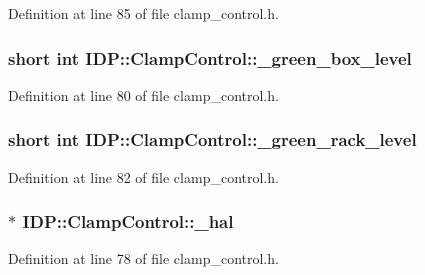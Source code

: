 Definition at line 85 of file clamp\_\-control.h.

\hypertarget{classIDP_1_1ClampControl_a4525ba276d66d2d29a8f1feb956bb769}{
\subsubsection[{\_\-green\_\-box\_\-level}]{\setlength{\rightskip}{0pt plus 5cm}short int {\bf IDP::ClampControl::\_\-green\_\-box\_\-level}}}
\label{classIDP_1_1ClampControl_a4525ba276d66d2d29a8f1feb956bb769}


Definition at line 80 of file clamp\_\-control.h.

\hypertarget{classIDP_1_1ClampControl_af6424de6982b37b9aab8d190b06d51be}{
\subsubsection[{\_\-green\_\-rack\_\-level}]{\setlength{\rightskip}{0pt plus 5cm}short int {\bf IDP::ClampControl::\_\-green\_\-rack\_\-level}}}
\label{classIDP_1_1ClampControl_af6424de6982b37b9aab8d190b06d51be}


Definition at line 82 of file clamp\_\-control.h.

\hypertarget{classIDP_1_1ClampControl_ac0c31fdbef30bc0c0d729843c8874475}{
\subsubsection[{\_\-hal}]{$\ast$ {\bf IDP::ClampControl::\_\-hal}}}
\label{classIDP_1_1ClampControl_ac0c31fdbef30bc0c0d729843c8874475}


Definition at line 78 of file clamp\_\-control.h.

